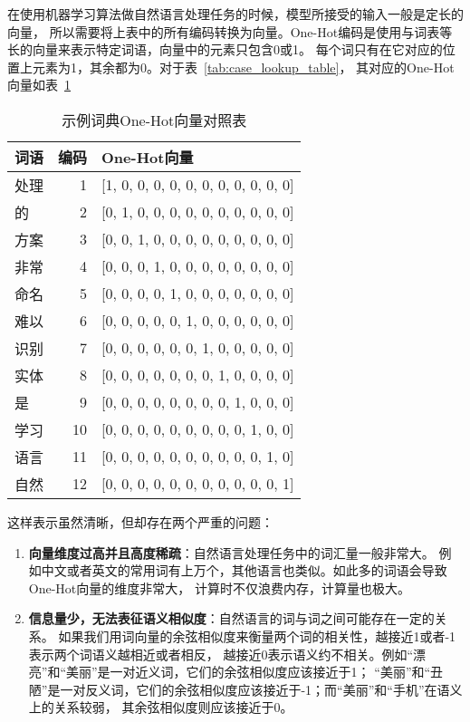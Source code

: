 在使用机器学习算法做自然语言处理任务的时候，模型所接受的输入一般是定长的向量，
所以需要将上表中的所有编码转换为向量。One-Hot编码是使用与词表等长的向量来表示特定词语，向量中的元素只包含0或1。
每个词只有在它对应的位置上元素为1，其余都为0。对于表~\ref{tab:case_lookup_table}，
其对应的One-Hot向量如表~\ref{tab:case_one_hot_lookup_table}

\begin{table}[!hpt]
    \caption[示例词典One-Hot向量对照表]{示例词典One-Hot向量对照表}
    \label{tab:case_one_hot_lookup_table}
    \centering
    \begin{tabular}{lrl} \toprule
      词语  &   编码 &  One-Hot向量 \\ \midrule
      处理	&	1	&   [1, 0, 0, 0, 0, 0, 0, 0, 0, 0, 0, 0]	\\
      的	&	2	&	[0, 1, 0, 0, 0, 0, 0, 0, 0, 0, 0, 0]	\\
      方案	&	3	&	[0, 0, 1, 0, 0, 0, 0, 0, 0, 0, 0, 0]	\\
      非常	&	4	&	[0, 0, 0, 1, 0, 0, 0, 0, 0, 0, 0, 0]	\\
      命名	&	5	&	[0, 0, 0, 0, 1, 0, 0, 0, 0, 0, 0, 0]	\\
      难以	&	6	&	[0, 0, 0, 0, 0, 1, 0, 0, 0, 0, 0, 0]	\\
      识别	&	7	&	[0, 0, 0, 0, 0, 0, 1, 0, 0, 0, 0, 0]	\\
      实体	&	8	&	[0, 0, 0, 0, 0, 0, 0, 1, 0, 0, 0, 0]	\\
      是	&	9	&	[0, 0, 0, 0, 0, 0, 0, 0, 1, 0, 0, 0]	\\
      学习	&	10	&	[0, 0, 0, 0, 0, 0, 0, 0, 0, 1, 0, 0]	\\
      语言	&	11	&	[0, 0, 0, 0, 0, 0, 0, 0, 0, 0, 1, 0]	\\
      自然	&	12	&	[0, 0, 0, 0, 0, 0, 0, 0, 0, 0, 0, 1]	\\ \bottomrule
    \end{tabular}
\end{table}

这样表示虽然清晰，但却存在两个严重的问题：
\begin{enumerate}
    \item \textbf{向量维度过高并且高度稀疏}：自然语言处理任务中的词汇量一般非常大。
    例如中文或者英文的常用词有上万个，其他语言也类似。如此多的词语会导致One-Hot向量的维度非常大，
    计算时不仅浪费内存，计算量也极大。
    \item \textbf{信息量少，无法表征语义相似度}：自然语言的词与词之间可能存在一定的关系。
    如果我们用词向量的余弦相似度来衡量两个词的相关性，越接近1或者-1表示两个词语义越相近或者相反，
    越接近0表示语义约不相关。例如“漂亮”和“美丽”是一对近义词，它们的余弦相似度应该接近于1；
    “美丽”和“丑陋”是一对反义词，它们的余弦相似度应该接近于-1；而“美丽”和“手机”在语义上的关系较弱，
    其余弦相似度则应该接近于0。
\end{enumerate}


